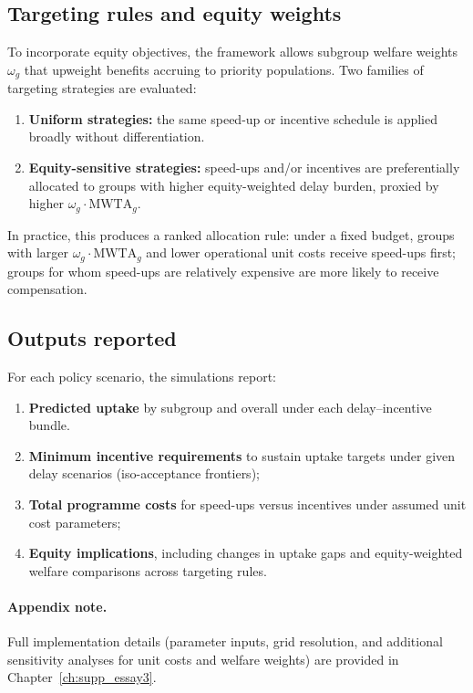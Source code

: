 \documentclass[doublespacing]{utdthesis}
\begin{document}
\subsection{Targeting rules and equity weights}
\label{subsec:essay3_targeting}

To incorporate equity objectives, the framework allows subgroup welfare weights $\omega_g$ that upweight benefits accruing to priority populations. Two families of targeting strategies are evaluated:

\begin{enumerate}[leftmargin=*]
\item \textbf{Uniform strategies:} the same speed-up or incentive schedule is applied broadly without differentiation.
\item \textbf{Equity-sensitive strategies:} speed-ups and/or incentives are preferentially allocated to groups with higher equity-weighted delay burden, proxied by higher $\omega_g \cdot \text{MWTA}_g$.
\end{enumerate}

In practice, this produces a ranked allocation rule: under a fixed budget, groups with larger $\omega_g \cdot \text{MWTA}_g$ and lower operational unit costs receive speed-ups first; groups for whom speed-ups are relatively expensive are more likely to receive compensation.

\subsection{Outputs reported}
\label{subsec:essay3_outputs}

For each policy scenario, the simulations report:
\begin{enumerate}[leftmargin=*]
\item \textbf{Predicted uptake} by subgroup and overall under each delay--incentive bundle.
\item \textbf{Minimum incentive requirements} to sustain uptake targets under given delay scenarios (iso-acceptance frontiers);
\item \textbf{Total programme costs} for speed-ups versus incentives under assumed unit cost parameters;
\item \textbf{Equity implications}, including changes in uptake gaps and equity-weighted welfare comparisons across targeting rules.
\end{enumerate}

\paragraph{Appendix note.}
Full implementation details (parameter inputs, grid resolution, and additional sensitivity analyses for unit costs and welfare weights) are provided in Chapter~\ref{ch:supp_essay3}.
\end{document}
